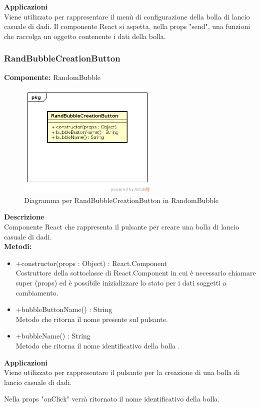 \textbf{Applicazioni}\\
Viene utilizzato per rappresentare il menù di configurazione della bolla di lancio casuale di dadi. Il componente React si aspetta, nella props "send", una funzioni che raccolga un oggetto contenente i dati della bolla. 


\clearpage

\subsubsection{RandBubbleCreationButton}
\textbf{Componente:}  RandomBubble\\
   \FloatBarrier
   \begin{figure}[ht]
   \centering
   \includegraphics[width=0.6\textwidth]{img/single-RandBubbleCreationButton}
   \caption{{Diagramma per RandBubbleCreationButton in RandomBubble}}
\end{figure}
\FloatBarrier
\textbf{Descrizione}\\
Componente React che rappresenta il pulsante per creare una bolla di lancio casuale di dadi.
\\
\textbf{Metodi:} 
\begin{itemize}
\item +constructor(props : Object) : React.Component 
\\
Costruttore della sottoclasse di React.Component in cui è necessario chiamare super (props) ed è possibile inizializzare lo stato per i dati soggetti a cambiamento.

\item +bubbleButtonName() : String 
\\
Metodo che ritorna il nome presente sul pulsante.

\item +bubbleName() : String 
\\
Metodo che ritorna il nome identificativo della bolla .

\end{itemize} 


\textbf{Applicazioni}\\
Viene utilizzato per rappresentare il pulsante per la creazione di una bolla di lancio casuale di dadi.

Nella props "onClick" verrà ritornato il nome identificativo della bolla. 


